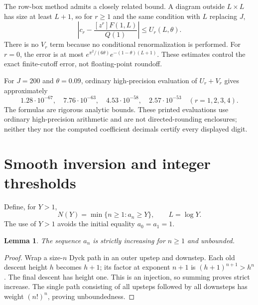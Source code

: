 \documentclass[11pt,letterpaper]{article}
\numberwithin{equation}{section}
\newtheorem{lemma}[theorem]{Lemma}
\theoremstyle{remark}\newtheorem{remark}[theorem]{Remark}
\begin{document}
The row-box method admits a closely related bound. A diagram outside $L\times L$ has size at least $L+1$, so for $r\ge1$ and the same condition with $L$ replacing $J$,
\begin{equation}\label{pwd:dg:eq:boxcutoff}
 \left|c_r-\frac{[z^r]F(1,L)}{Q(1)}\right|\le U_r(L,\theta).
\end{equation}
There is no $V_r$ term because no conditional renormalization is performed. For $r=0$, the error is at most $e^{\pi^2/(6\theta)}e^{-(1-\theta)(L+1)}$. These estimates control the exact finite-cutoff error, not floating-point roundoff.

For $J=200$ and $\theta=0.09$, ordinary high-precision evaluation of $U_r+V_r$ gives approximately
\[
 1.28\cdot10^{-67},\quad 7.76\cdot10^{-63},\quad
 4.53\cdot10^{-58},\quad 2.57\cdot10^{-53}
 \quad (r=1,2,3,4).
\]
The formulas are rigorous analytic bounds. These printed evaluations use ordinary high-precision arithmetic and are not directed-rounding enclosures; neither they nor the computed coefficient decimals certify every displayed digit.

\section{Smooth inversion and integer thresholds}\label{pwd:dg:sec:inverse}
Define, for $Y>1$,
\begin{equation}\label{pwd:dg:eq:N}
 N(Y)=\min\{n\ge1:a_n\ge Y\},\qquad L=\log Y.
\end{equation}
The use of $Y>1$ avoids the initial equality $a_0=a_1=1$.

\begin{lemma}\label{pwd:dg:lem:monotone}
The sequence $a_n$ is strictly increasing for $n\ge1$ and unbounded.
\end{lemma}
\begin{proof}
Wrap a size-$n$ Dyck path in an outer upstep and downstep. Each old descent height $h$ becomes $h+1$; its factor at exponent $n+1$ is $(h+1)^{n+1}>h^n$. The final descent has height one. This is an injection, so summing proves strict increase. The single path consisting of all upsteps followed by all downsteps has weight $(n!)^n$, proving unboundedness.
\end{proof}
\end{document}
